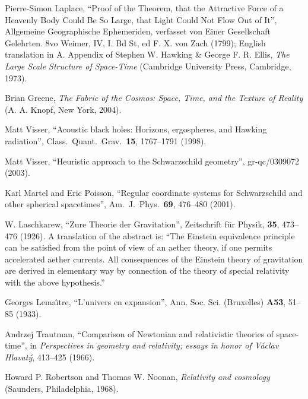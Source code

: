 \documentclass[twocolumn,showpacs,preprintnumbers,amsmath,amssymb,prb]{revtex4}
\begin{document}
\begin{thebibliography}{}
Pierre-Simon Laplace,
``Proof of the Theorem, that the Attractive Force of a Heavenly Body Could
Be So Large, that Light Could Not Flow Out of It'',
Allgemeine Geographische Ephemeriden,
verfasset von Einer Gesellschaft Gelehrten.
8vo Weimer, IV, I. Bd St,
ed F. X. von Zach (1799);
English translation in A. Appendix of
Stephen W. Hawking \& George F. R. Ellis,
{\sl The Large Scale Structure of Space-Time}
(Cambridge University Press, Cambridge, 1973).

Brian Greene,
{\sl The Fabric of the Cosmos: Space, Time, and the Texture of Reality}
(A. A. Knopf, New York, 2004).


Matt Visser,
``Acoustic black holes: Horizons, ergospheres, and Hawking radiation'',
Class.\ Quant.\ Grav.\  \textbf{15}, 1767--1791 (1998).

Matt Visser,
``Heuristic approach to the Schwarzschild geometry'',
gr-qc/0309072 (2003).

Karl Martel and Eric Poisson,
``Regular coordinate systems for Schwarzschild and
other spherical  spacetimes'',
Am.\ J.\ Phys.\  \textbf{69}, 476--480 (2001).

W. Laschkarew,
``Zure Theorie der Gravitation'',
Zeitschrift f\"ur Physik, \textbf{35}, 473--476 (1926).
A translation of the abstract is:
``The Einstein equivalence principle can be satisfied from the point of view
of an aether theory, if one permits accelerated aether currents.
All consequences of the Einstein theory of gravitation are derived in elementary way
by connection of the theory of special relativity with the above hypothesis.''

Georges Lema\^\i{}tre,
``L'univers en expansion'',
Ann. Soc. Sci. (Bruxelles) \textbf{A53}, 51--85 (1933).

Andrzej Trautman,
``Comparison of Newtonian and relativistic theories of space-time'',
in {\sl Perspectives in geometry and relativity; essays in honor of V\'aclav Hlavat\'y},
413--425 (1966).

Howard P. Robertson and Thomas W. Noonan,
{\sl Relativity and cosmology}
(Saunders, Philadelphia, 1968).


\end{thebibliography}
\end{document}

